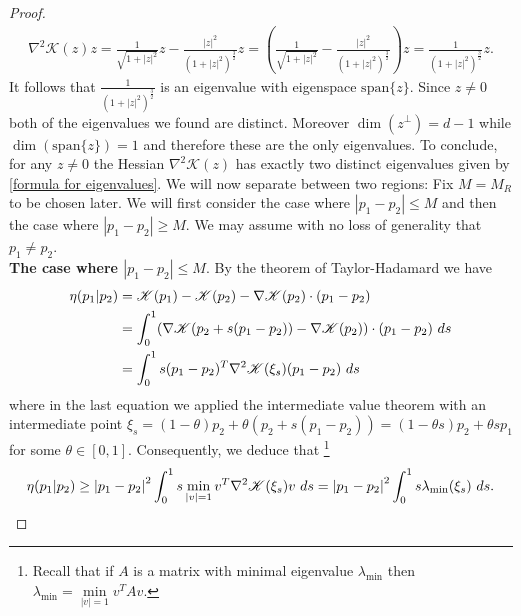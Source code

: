 \documentclass[10pt,a4paper]{amsart}
\def\dd{{\rm d}}
\begin{document}
\begin{proof}
\begin{align*}
\nabla^{2}\mathscr{K}(z)z=\frac{1}{\sqrt{1+\left\vert z\right\vert^{2} }}z-\frac{\left\vert z\right\vert^{2} }{(1+\left\vert z\right\vert^{2} )^{\frac{3}{2}}}z=\left(\frac{1}{\sqrt{1+\left\vert z\right\vert^{2}}}-\frac{\left\vert z\right\vert^{2}}{(1+\left\vert z\right\vert^{2} )^{\frac{3}{2}}}\right)z=\frac{1}{(1+\left\vert z\right\vert^{2})^{\frac{3}{2}}}z.    
\end{align*}
It follows that $\frac{1}{(1+\left\vert z\right\vert^{2})^{\frac{3}{2}}}$ is an eigenvalue with eigenspace $\mathrm{span}\{z\}$. Since $z\neq 0$ both of the eigenvalues we found are distinct. Moreover $\dim(z^{\perp})=d-1$ while $\dim(\mathrm{span}\{z\}{})=1$ and therefore these are the only eigenvalues. 
To conclude, for any $z\neq 0$ the Hessian  $\nabla^{2}\mathscr{K}(z)$ has exactly two distinct eigenvalues given by \ref{formula for eigenvalues}.
We will now separate between two regions: Fix $M=M_{R}$ to be chosen later.  We will first consider the case where $\left\vert p_{1}-p_{2}\right\vert\leq M $ and then the case where $\left\vert p_{1}-p
_{2}\right\vert\geq M$. We may assume with no loss of generality that $p_{1}\neq p_{2}$. \\ 
\textbf{The case where $\left\vert p_{1}-p_{2}\right\vert\leq M$}. By the theorem of Taylor-Hadamard we have 
\begin{align*}
\eta(p_{1}\vert p_{2})&=\mathscr{K}(p_{1})-\mathscr{K}(p_{2})-\nabla \mathscr{K}(p_{2})\cdot (p_{1}-p_{2})\\
&=\int_{0}^{1}(\nabla \mathscr{K}(p_{2}+s(p_{1}-p_{2}))-\nabla \mathscr{K}(p_{2}))\cdot (p_{1}-p_{2})\ \dd s\\
&= \int_{0}^{1} s(p_{1}-p_{2})^{T}\nabla^{2}\mathscr{K}(\xi_{s})(p_{1}-p_{2})\ \dd s
\end{align*}
where in the last equation we applied the intermediate value theorem with an intermediate point $\xi_{s}=(1-\theta )p_{2}+\theta(p_{2}+s(p_{1}-p_{2}))=(1-\theta s)p_{2}+\theta sp_{1}$ for some $\theta \in [0,1]$. Consequently, we deduce that \footnote{Recall that if $A$ is a matrix with minimal eigenvalue $\lambda_{\min}$ then $\lambda_{\min}=\underset{\left\vert v\right\vert=1 }{\min}v^{T}Av$. }  
\begin{align}
\eta(p_{1}\vert p_{2})\geq \left\vert p_{1}-p_{2}\right\vert^{2} \int_{0}^{1}s\min_{\left\vert v\right\vert=1 }v^{T}\nabla^{2}\mathscr{K}(\xi_{s})v\ \dd s
=\left\vert p_{1}-p_{2}\right\vert^{2} \int_{0}^{1}s\lambda_{\min}(\xi_{s})\ \dd s. \label{eta(p1p2) est in term integral}   

\end{align}
\end{proof}
\end{document}

